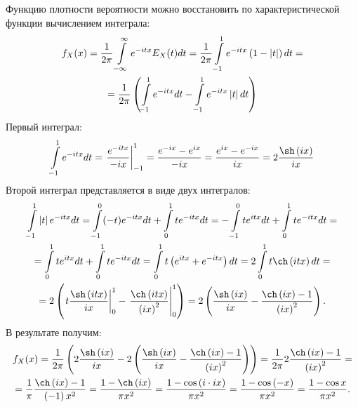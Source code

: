 Функцию плотности вероятности можно восстановить по характеристической функции вычислением интеграла:
\begin{multline}
    f_X(x)
    = \frac{1}{2 \pi} \int \limits_{-\infty}^\infty e^{-itx} E_X(t) dt
    = \frac{1}{2 \pi} \int \limits_{-1}^1 e^{-itx} \left ( 1 - \left | t \right | \right ) dt = \\
    = \frac{1}{2 \pi} \left ( \int \limits_{-1}^1 e^{-itx} dt - \int \limits_{-1}^1 e^{-itx} \left | t \right | dt \right )
\end{multline}
Первый интеграл:
\begin{equation}
    \int \limits_{-1}^1 e^{-itx} dt
    = \left . \frac{e^{-itx}}{-ix} \right |_{-1}^1
    = \frac{e^{-ix} - e^{ix}}{-ix}
    = \frac{e^{ix} - e^{-ix}}{ix}
    = 2 \frac{\sh \left ( ix \right )}{ix}
\end{equation}
Второй интеграл представляется в виде двух интегралов:
\begin{multline}
    \int \limits_{-1}^1 \modulus{t} e^{-itx} dt
    = \int \limits_{-1}^0 (-t) e^{-itx} dt + \int \limits_0^1 t e^{-itx} dt
    = - \int \limits_{-1}^0 t e^{itx} dt + \int \limits_0^1 t e^{-itx} dt = \\
    = \int \limits_0^1 t e^{itx} dt + \int \limits_0^1 t e^{-itx} dt
    = \int \limits_0^1 t \left ( e^{itx} + e^{-itx} \right ) dt
    = 2 \int \limits_0^1 t \ch \left ( itx \right ) dt = \\
    = 2 \left ( \left . t \frac{\sh \left ( itx \right )}{ix} \right |_0^1 - \left . \frac{\ch \left ( itx \right )}{\left ( ix \right )^2} \right |_0^1 \right )
    = 2 \left ( \frac{\sh \left ( ix \right )}{ix} - \frac{\ch \left ( ix \right ) - 1}{\left ( ix \right )^2} \right ) .
\end{multline}
В результате получим:
\begin{multline}
    f_X(x)
    = \frac{1}{2 \pi} \left ( 2 \frac{\sh \left ( ix \right )}{ix} - 2 \left ( \frac{\sh \left ( ix \right )}{ix} - \frac{\ch \left ( ix \right ) - 1}{\left ( ix \right )^2} \right ) \right )
    = \frac{1}{2 \pi} 2 \frac{\ch \left ( ix \right ) - 1}{\left ( ix \right )^2} = \\
    = \frac{1}{\pi} \frac{\ch \left ( ix \right ) - 1}{\left ( -1 \right ) x^2}
    = \frac{1 - \ch \left ( ix \right )}{\pi x^2}
    = \frac{1 - \cos \left ( i \cdot ix \right )}{\pi x^2}
    = \frac{1 - \cos \left ( -x \right )}{\pi x^2}
    = \frac{1 - \cos x}{\pi x^2} .
\end{multline}

